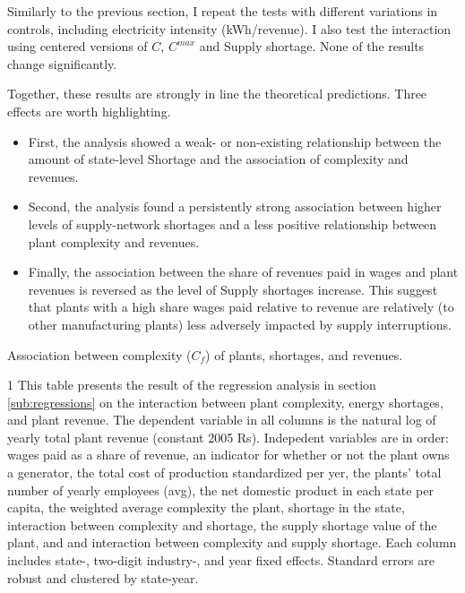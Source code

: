 \documentclass[11pt]{article}
\begin{document}
Similarly to the previous section, I repeat the tests with different variations in controls, including electricity intensity (kWh/revenue). I also test the interaction using centered versions of $C$, $C^{max}$ and Supply shortage. None of the results change significantly. 

Together, these results are strongly in line the theoretical predictions. Three effects are worth highlighting. 

\begin{itemize}
	\item First, the analysis showed a weak- or non-existing relationship between the amount of state-level Shortage and the association of complexity and revenues.
	\item Second, the analysis found a persistently strong association between higher levels of supply-network shortages and a less positive relationship between plant complexity and revenues.

	\item Finally, the association between the share of revenues paid in wages and plant revenues is reversed as the level of Supply shortages increase. This suggest that plants with a high share wages paid relative to revenue are relatively (to other manufacturing plants) less adversely impacted by supply interruptions.
	\end{itemize}

\begin{sidewaystable}
	\begin{center}
		\begin{threeparttable}
		\caption{Association between complexity ($C_{f}$) of plants, shortages, and revenues.}
			\label{tab:interaction_avg_pci}
			
			\begin{tablenotes} \footnotesize
			\item[1] This table presents the result of the regression analysis in section \ref{sub:regressions} on the interaction between plant complexity, energy shortages, and plant revenue. The dependent variable in all columns is the natural log of yearly total plant revenue (constant 2005 Rs). Indepedent variables are in order: wages paid as a share of revenue, an indicator for whether or not the plant owns a generator, the total cost of production standardized per yer, the plants' total number of yearly employees (avg), the net domestic product in each state per capita, the weighted average complexity the plant, shortage in the state, interaction between complexity and shortage, the supply shortage value of the plant, and and interaction between complexity and supply shortage. Each column includes state-, two-digit industry-, and year fixed effects. Standard errors are robust and clustered by state-year.
			\end{tablenotes}
		\end{threeparttable}
	\end{center}
\end{sidewaystable}
\end{document}
